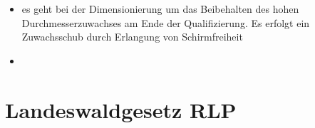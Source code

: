 \documentclass{article}
\begin{document}
\begin{itemize}
 \item es geht bei der Dimensionierung um das Beibehalten des hohen Durchmesserzuwachses am Ende der Qualifizierung. Es erfolgt ein Zuwachsschub durch Erlangung von Schirmfreiheit

 \item 


























































\end{itemize}




\newpage
\section{Landeswaldgesetz RLP}
\end{document}
